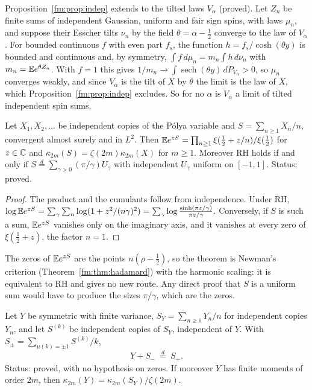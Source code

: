 Proposition~\ref{fm:prop:indep} extends to the tilted laws $V_\alpha$ (proved). Let $Z_n$ be finite sums of independent Gaussian, uniform and fair sign spins, with laws $\mu_n$, and suppose their Esscher tilts $\nu_n$ by the field $\theta=\alpha-\frac12$ converge to the law of $V_\alpha$. For bounded continuous $f$ with even part $f_s$, the function $h=f_s/\cosh(\theta y)$ is bounded and continuous and, by symmetry, $\int f\,d\mu_n=m_n\int h\,d\nu_n$ with $m_n=\mathbb{E} e^{\theta Z_n}$. With $f=1$ this gives $1/m_n\to\int\operatorname{sech}(\theta y)\,dP_{V_\alpha}>0$, so $\mu_n$ converges weakly, and since $V_\alpha$ is the tilt of $X$ by $\theta$ the limit is the law of $X$, which Proposition~\ref{fm:prop:indep} excludes. So for no $\alpha$ is $V_\alpha$ a limit of tilted independent spin sums.

\begin{theorem}\label{fm:thm:harmonic}
Let $X_1,X_2,\dots$ be independent copies of the P\'olya variable and $S=\sum_{n\ge1}X_n/n$, convergent almost surely and in $L^2$. Then $\mathbb{E} e^{zS}=\prod_{n\ge1}\xi(\frac12+z/n)/\xi(\frac12)$ for $z\in\mathbb{C}$ and $\kappa_{2m}(S)=\zeta(2m)\kappa_{2m}(X)$ for $m\ge1$. Moreover RH holds if and only if $S\overset d=\sum_{\gamma>0}(\pi/\gamma)U_\gamma$ with independent $U_\gamma$ uniform on $[-1,1]$. Status: proved.
\end{theorem}

\begin{proof}
The product and the cumulants follow from independence. Under RH, $\log\mathbb{E} e^{zS}=\sum_\gamma\sum_n\log(1+z^2/(n\gamma)^2)=\sum_\gamma\log\frac{\sinh(\pi z/\gamma)}{\pi z/\gamma}$. Conversely, if $S$ is such a sum, $\mathbb{E} e^{zS}$ vanishes only on the imaginary axis, and it vanishes at every zero of $\xi(\frac12+z)$, the factor $n=1$.
\end{proof}

The zeros of $\mathbb{E} e^{zS}$ are the points $n(\rho-\frac12)$, so the theorem is Newman's criterion (Theorem~\ref{fm:thm:hadamard}) with the harmonic scaling: it is equivalent to RH and gives no new route. Any direct proof that $S$ is a uniform sum would have to produce the sizes $\pi/\gamma$, which are the zeros.

\begin{proposition}\label{fm:prop:mobius}
Let $Y$ be symmetric with finite variance, $S_Y=\sum_{n\ge1}Y_n/n$ for independent copies $Y_n$, and let $S^{(k)}$ be independent copies of $S_Y$, independent of $Y$. With $S_\pm=\sum_{\mu(k)=\pm1}S^{(k)}/k$,
\[
Y+S_-\ \overset d=\ S_+ .
\]
Status: proved, with no hypothesis on zeros. If moreover $Y$ has finite moments of order $2m$, then $\kappa_{2m}(Y)=\kappa_{2m}(S_Y)/\zeta(2m)$.
\end{proposition}

